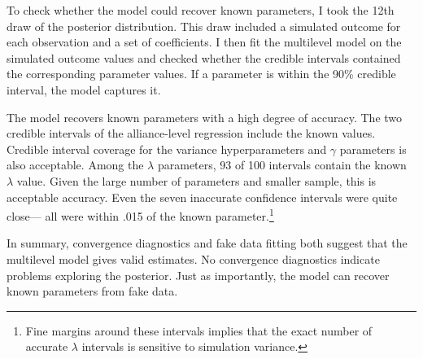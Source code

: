 \documentclass[12pt]{article}
\begin{document}
To check whether the model could recover known parameters, I took the 12th draw of the posterior distribution.
This draw included a simulated outcome for each observation and a set of coefficients. 
I then fit the multilevel model on the simulated outcome values and checked whether the credible intervals contained the corresponding parameter values. 
If a parameter is within the 90\% credible interval, the model captures it. 


The model recovers known parameters with a high degree of accuracy. 
The two credible intervals of the alliance-level regression include the known values.
Credible interval coverage for the variance hyperparameters and $\gamma$ parameters is also acceptable. 
%
%
Among the $\lambda$ parameters, 93 of 100 intervals contain the known $\lambda$ value.
Given the large number of parameters and smaller sample, this is acceptable accuracy. 
Even the seven inaccurate confidence intervals were quite close--- all were within .015 of the known parameter.\footnote{Fine margins around these intervals implies that the exact number of accurate $\lambda$ intervals is sensitive to simulation variance.}


In summary, convergence diagnostics and fake data fitting both suggest that the multilevel model gives valid estimates. 
No convergence diagnostics indicate problems exploring the posterior. 
Just as importantly, the model can recover known parameters from fake data. 
\end{document}
